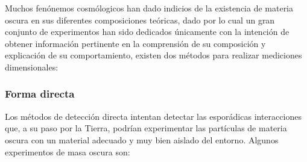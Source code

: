Muchos fenónemos cosmólogicos han dado indicios de la existencia de materia oscura en sus diferentes composiciones teóricas, dado por lo cual un gran conjunto de experimentos han sido dedicados únicamente con la intención de obtener información pertinente en la comprensión de su composición y explicación de su comportamiento, existen dos métodos para realizar mediciones dimensionales:

\subsubsection{Forma directa}
Los métodos de detección directa intentan detectar las esporádicas interacciones que, a su paso por la Tierra, podrían experimentar
las partículas de materia oscura con un material adecuado y muy bien aislado del entorno.%
Algunos experimentos de masa oscura son:

